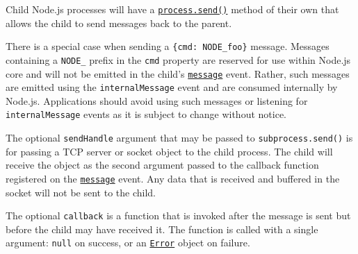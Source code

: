 \begin{Shaded}
\begin{Highlighting}[]
\NormalTok{(}\OperatorTok{,}\KeywordTok{=\textgreater{}}\NormalTok{ \{}
  \NormalTok{(}\OperatorTok{,}\OperatorTok{;}
\NormalTok{\})}\OperatorTok{;}

\NormalTok{(\{ }\OperatorTok{:} \OperatorTok{,} \OperatorTok{:} \NormalTok{ \})}\OperatorTok{;}
\end{Highlighting}
\end{Shaded}

Child Node.js processes will have a
\href{process.md\#processsendmessage-sendhandle-options-callback}{\texttt{process.send()}}
method of their own that allows the child to send messages back to the
parent.

There is a special case when sending a
\texttt{\{cmd:\ \textquotesingle{}NODE\_foo\textquotesingle{}\}}
message. Messages containing a \texttt{NODE\_} prefix in the
\texttt{cmd} property are reserved for use within Node.js core and will
not be emitted in the child's
\href{process.md\#event-message}{\texttt{\textquotesingle{}message\textquotesingle{}}}
event. Rather, such messages are emitted using the
\texttt{\textquotesingle{}internalMessage\textquotesingle{}} event and
are consumed internally by Node.js. Applications should avoid using such
messages or listening for
\texttt{\textquotesingle{}internalMessage\textquotesingle{}} events as
it is subject to change without notice.

The optional \texttt{sendHandle} argument that may be passed to
\texttt{subprocess.send()} is for passing a TCP server or socket object
to the child process. The child will receive the object as the second
argument passed to the callback function registered on the
\href{process.md\#event-message}{\texttt{\textquotesingle{}message\textquotesingle{}}}
event. Any data that is received and buffered in the socket will not be
sent to the child.

The optional \texttt{callback} is a function that is invoked after the
message is sent but before the child may have received it. The function
is called with a single argument: \texttt{null} on success, or an
\href{errors.md\#class-error}{\texttt{Error}} object on failure.


